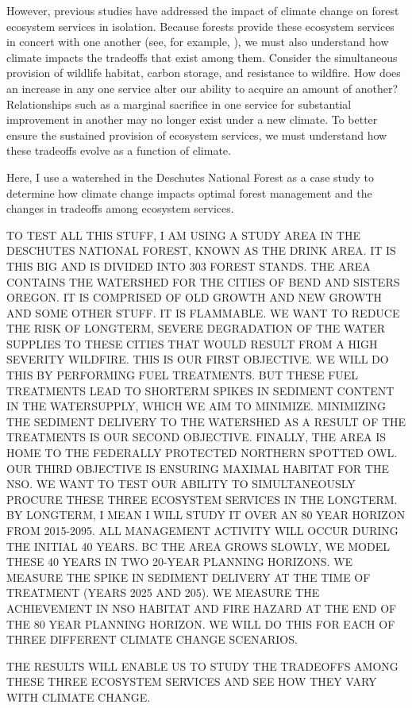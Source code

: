 However, previous studies have addressed the impact of climate change on forest ecosystem services in isolation. Because forests provide these ecosystem services in concert with one another (see, for example, \cite{toth2009finding}), we must also understand how climate impacts the tradeoffs that exist among them. Consider the simultaneous provision of wildlife habitat, carbon storage, and resistance to wildfire. How does an increase in any one service alter our ability to acquire an amount of another? Relationships such as a marginal sacrifice in one service for substantial improvement in another may no longer exist under a new climate. To better ensure the sustained provision of ecosystem services, we must understand how these tradeoffs evolve as a function of climate.

Here, I use a watershed in the Deschutes National Forest as a case study to determine how climate change impacts optimal forest management and the changes in tradeoffs among ecosystem services.

TO TEST ALL THIS STUFF, I AM USING A STUDY AREA IN THE DESCHUTES NATIONAL FOREST, KNOWN AS THE DRINK AREA. IT IS THIS BIG AND IS DIVIDED INTO 303 FOREST STANDS. THE AREA CONTAINS THE WATERSHED FOR THE CITIES OF BEND AND SISTERS OREGON. IT IS COMPRISED OF OLD GROWTH AND NEW GROWTH AND SOME OTHER STUFF. IT IS FLAMMABLE. WE WANT TO REDUCE THE RISK OF LONGTERM, SEVERE DEGRADATION OF THE WATER SUPPLIES TO THESE CITIES THAT WOULD RESULT FROM A HIGH SEVERITY WILDFIRE. THIS IS OUR FIRST OBJECTIVE. WE WILL DO THIS BY PERFORMING FUEL TREATMENTS. BUT THESE FUEL TREATMENTS LEAD TO SHORTERM SPIKES IN SEDIMENT CONTENT IN THE WATERSUPPLY, WHICH WE AIM TO MINIMIZE. MINIMIZING THE SEDIMENT DELIVERY TO THE WATERSHED AS A RESULT OF THE TREATMENTS IS OUR SECOND OBJECTIVE. FINALLY, THE AREA IS HOME TO THE FEDERALLY PROTECTED NORTHERN SPOTTED OWL. OUR THIRD OBJECTIVE IS ENSURING MAXIMAL HABITAT FOR THE NSO. WE WANT TO TEST OUR ABILITY TO SIMULTANEOUSLY PROCURE THESE THREE ECOSYSTEM SERVICES IN THE LONGTERM. BY LONGTERM, I MEAN I WILL STUDY IT OVER AN 80 YEAR HORIZON FROM 2015-2095. ALL MANAGEMENT ACTIVITY WILL OCCUR DURING THE INITIAL 40 YEARS. BC THE AREA GROWS SLOWLY, WE MODEL THESE 40 YEARS IN TWO 20-YEAR PLANNING HORIZONS. WE MEASURE THE SPIKE IN SEDIMENT DELIVERY AT THE TIME OF TREATMENT (YEARS 2025 AND 205). WE MEASURE THE ACHIEVEMENT IN NSO HABITAT AND FIRE HAZARD AT THE END OF THE 80 YEAR PLANNING HORIZON. WE WILL DO THIS FOR EACH OF THREE DIFFERENT CLIMATE CHANGE SCENARIOS.

THE RESULTS WILL ENABLE US TO STUDY THE TRADEOFFS AMONG THESE THREE ECOSYSTEM SERVICES AND SEE HOW THEY VARY WITH CLIMATE CHANGE.